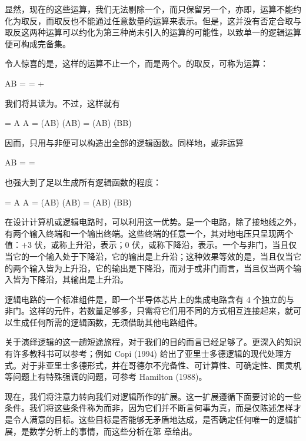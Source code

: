 显然，现在的这些运算，我们无法剔除一个，而只保留另一个，亦即，运算不能约化为取反，而取反也不能通过任意数量的运算来表示。但是，这并没有否定合取与取反这两种运算可以约化为第三种尚未引入的运算的可能性，以致单一的逻辑运算便可构成完备集。

令人惊喜的是，这样的运算不止一个，而是两个。的取反，可称为运算：

\placeformula
\startformula
A\uparrow B =  =  + 
\stopformula

我们将其读为。不过，这样就有

\placeformula
\startformula
\startalign
\NC {} \NC = A \uparrow A\NR
\NC {} \NC = (A\uparrow B) \uparrow (A\uparrow B)\NR
\NC {} \NC = (A\uparrow B) \uparrow (B\uparrow B)\NR
\stopalign
\stopformula

因而，只用与非便可以构造出全部的逻辑函数。同样地，或非运算

\placeformula
\startformula
A\downarrow B =  = 
\stopformula

也强大到了足以生成所有逻辑函数的程度：

\placeformula
\startformula
\startalign
\NC {} \NC = A \downarrow A\NR
\NC {} \NC = (A\downarrow B) \downarrow (A\downarrow B)\NR
\NC {} \NC = (A\downarrow B) \uparrow (B\downarrow B)\NR
\stopalign
\stopformula

在设计计算机或逻辑电路时，可以利用这一优势。是一个电路，除了接地线之外，有两个输入终端和一个输出终端。这些终端的任意一个，其对地电压只呈现两个值：$+3$ 伏，或称上升沿，表示；$0$ 伏，或称下降沿，表示。一个与非门，当且仅当它的一个输入处于下降沿，它的输出是上升沿；这种效果等效的是，当且仅当它的两个输入皆为上升沿，它的输出是下降沿，而对于或非门而言，当且仅当两个输入皆为下降沿，其输出是上升沿。

逻辑电路的一个标准组件是，即一个半导体芯片上的集成电路含有 4 个独立的与非门。这样的元件，若数量足够多，只需将它们用不同的方式相互连接起来，就可以生成任何所需的逻辑函数，无须借助其他电路组件。

关于演绎逻辑的这一趟短途旅程，对于我们的目的而言已经足够了。更深入的知识有许多教科书可以参考；例如 Copi (1994) 给出了亚里士多德逻辑的现代处理方式。对于非亚里士多德形式，并在哥德尔不完备性、可计算性、可确定性、图灵机等问题上有特殊强调的问题，可参考 Hamilton (1988)。

现在，我们将注意力转向我们对逻辑所作的扩展。这一扩展遵循下面要讨论的一些条件。我们将这些条件称为而非，因为它们并不断言何事为真，而是仅陈述怎样才是令人满意的目标。这些目标是否能够无矛盾地达成，是否确定任何唯一的逻辑扩展，是数学分析上的事情，而这些分析在第  章给出。

